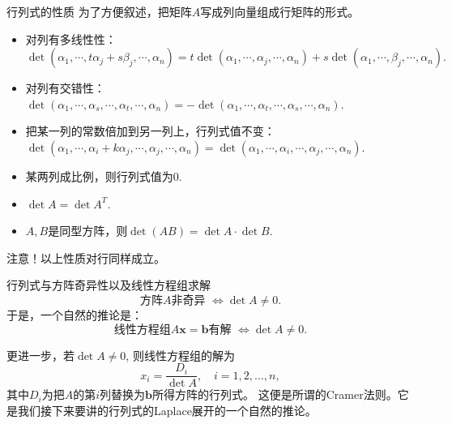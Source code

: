 \begin{frame}

\begin{block}{行列式的性质}
为了方便叙述，把矩阵$A$写成列向量组成行矩阵的形式。
\begin{itemize}
\item 对列有多线性性：$\det(\alpha_1, \cdots, t\alpha_j + s\beta_j, \cdots, \alpha_n) = t\det(\alpha_1, \cdots, \alpha_j, \cdots, \alpha_n) + s\det(\alpha_1, \cdots, \beta_j, \cdots, \alpha_n).$
\item 对列有交错性：$\det(\alpha_1, \cdots, \alpha_s, \cdots, \alpha_t, \cdots, \alpha_n) = -\det(\alpha_1, \cdots, \alpha_t, \cdots, \alpha_s, \cdots, \alpha_n).$
\item 把某一列的常数倍加到另一列上，行列式值不变：$\det(\alpha_1, \cdots, \alpha_i + k\alpha_j, \cdots, \alpha_j, \cdots, \alpha_n) = \det(\alpha_1, \cdots, \alpha_i, \cdots, \alpha_j, \cdots, \alpha_n).$
\item 某两列成比例，则行列式值为0.
\item $\det A = \det A^T$.
\item $A,B$是同型方阵，则$\det(AB) = \det A \cdot \det B$.
\end{itemize}
\end{block}

{\color{red}注意！}以上性质对行同样成立。

\end{frame}


\begin{frame}

\begin{block}{行列式与方阵奇异性以及线性方程组求解}
$$\text{方阵$A$非奇异 } \Longleftrightarrow \det A \neq 0.$$
于是，一个自然的推论是：
$$\text{线性方程组$A\mathbf{x} = \mathbf{b}$有解 } \Longleftrightarrow \det A \neq 0.$$

\pause

更进一步，若$\det A \neq 0$, 则线性方程组的解为
$$x_i = \dfrac{D_i}{\det A}, \quad i = 1,2,\ldots,n,$$
其中$D_i$为把$A$的第$i$列替换为$\mathbf{b}$所得方阵的行列式。\newline
这便是所谓的Cramer法则。它是我们接下来要讲的行列式的Laplace展开的一个自然的推论。
\end{block}

\end{frame}


